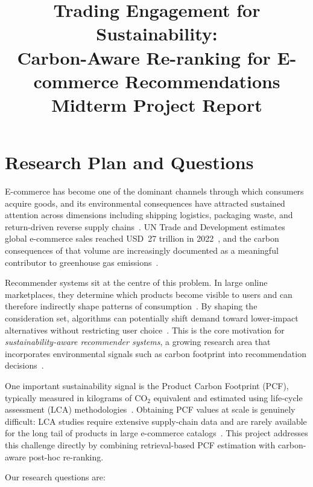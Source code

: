 \documentclass[11pt]{article}
\title{\textbf{Trading Engagement for Sustainability:\\
Carbon-Aware Re-ranking for E-commerce Recommendations}\\[0.5em]
\large Midterm Project Report}
\author{}
\date{}
\begin{document}
\maketitle

\section{Research Plan and Questions}

E-commerce has become one of the dominant channels through which consumers
acquire goods, and its environmental consequences have attracted sustained
attention across dimensions including shipping logistics, packaging waste,
and return-driven reverse supply chains~\cite{olah2023sustainable}. UN
Trade and Development estimates global e-commerce sales reached USD~27
trillion in 2022~\cite{unctad2024ecommerce}, and the carbon consequences
of that volume are increasingly documented as a meaningful contributor to
greenhouse gas emissions~\cite{buldeorai2023ecommerce}.

Recommender systems sit at the centre of this problem. In large online
marketplaces, they determine which products become visible to users and
can therefore indirectly shape patterns of consumption~\cite{chaney2018confounding}.
By shaping the consideration set, algorithms can potentially shift demand
toward lower-impact alternatives without restricting user
choice~\cite{halimeh2026nudging}. This is the core motivation for
\emph{sustainability-aware recommender systems}, a growing research area
that incorporates environmental signals such as carbon footprint into
recommendation decisions~\cite{spillo2023greenerrec, spillo2023sustainabilityaware,
ecoa2026, vicenti2026pcfllm}.

One important sustainability signal is the Product Carbon Footprint (PCF),
typically measured in kilograms of CO$_2$ equivalent and estimated using
life-cycle assessment (LCA) methodologies~\cite{meinrenken2022carboncatalogue}.
Obtaining PCF values at scale is genuinely difficult: LCA studies require
extensive supply-chain data and are rarely available for the long tail of
products in large e-commerce catalogs~\cite{spillo2023greenerrec, ecoa2026}.
This project addresses this challenge directly by combining retrieval-based
PCF estimation with carbon-aware post-hoc re-ranking.

Our research questions are:
\end{document}
